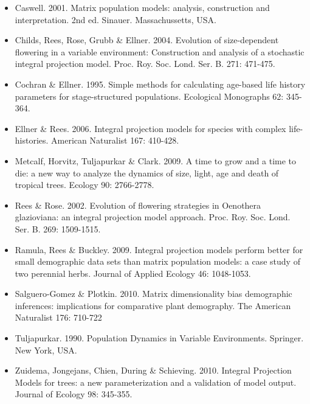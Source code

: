 \documentclass{article}
\begin{document}
\begin{itemize}
\item Caswell. 2001. Matrix population models: analysis, construction and interpretation. 2nd ed. Sinauer. Massachussetts, USA.

\item Childs, Rees, Rose, Grubb \& Ellner. 2004. Evolution of size-dependent flowering in a variable environment: Construction and analysis of a stochastic integral projection model. Proc. Roy. Soc. Lond. Ser. B. 271: 471-475.

\item Cochran \& Ellner. 1995. Simple methods for calculating age-based life history parameters for stage-structured populations. Ecological Monographs 62: 345-364.

\item Ellner \& Rees. 2006. Integral projection models for species with complex life-histories. American Naturalist 167: 410-428.

\item Metcalf, Horvitz, Tuljapurkar \& Clark. 2009. A time to grow and a time to die: a  new way to analyze the dynamics of size, light, age and death of tropical trees. Ecology 90: 2766-2778.

\item Rees \& Rose. 2002. Evolution of flowering strategies in Oenothera glazioviana: an integral projection model approach. Proc. Roy. Soc. Lond. Ser. B. 269: 1509-1515.

\item Ramula, Rees \& Buckley. 2009. Integral projection models perform better for small demographic data sets than matrix population models: a case study of two perennial herbs. Journal of Applied Ecology 46: 1048-1053.

\item Salguero-Gomez \& Plotkin. 2010. Matrix dimensionality bias demographic inferences: implications for comparative plant demography. The American Naturalist 176: 710-722

\item Tuljapurkar. 1990. Population Dynamics in Variable Environments. Springer. New York, USA.

\item Zuidema, Jongejans, Chien, During \& Schieving. 2010. Integral Projection Models for trees: a new parameterization and a validation of model output. Journal of Ecology 98: 345-355.


\end{itemize}
\end{document}
